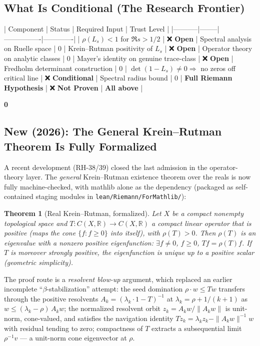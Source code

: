 \documentclass[11pt,a4paper]{article}
\newtheorem{theorem}{Theorem}[section]
\theoremstyle{definition}
\begin{document}
\subsection{What Is Conditional (The Research Frontier)}

| Component | Status | Required Input | Trust Level |
|-----------|--------|----------------|-------------|
| $\rho(L_s) < 1$ for $\Re s > 1/2$ | ❌ {\bf Open} | Spectral analysis on Ruelle space | 0%
| Krein–Rutman positivity of $L_s$ | ❌ {\bf Open} | Operator theory on analytic classes | 0%
| Mayer's identity on genuine trace-class | ❌ {\bf Open} | Fredholm determinant construction | 0%
| $\det(1 - L_s) \neq 0 \Rightarrow$ no zeros off critical line | ❌ {\bf Conditional} | Spectral radius bound | 0%
| {\bf Full Riemann Hypothesis} | ❌ {\bf Not Proven} | {\bf All above} | {\bf 0%

\subsection{New (2026): The General Krein--Rutman Theorem Is Fully Formalized}
\label{sec:kreinrutman}

A recent development (RH-38/39) closed the last admission in the
operator-theory layer. The \emph{general} Krein--Rutman existence theorem over
the reals is now fully machine-checked, with mathlib alone as the dependency
(packaged as self-contained staging modules in
\texttt{lean/Riemann/ForMathlib/}):

\begin{theorem}[Real Krein--Rutman, formalized]
Let $X$ be a compact nonempty topological space and
$T : C(X,\mathbb{R}) \to C(X,\mathbb{R})$ a compact linear operator that is
positive (maps the cone $\{f : f \geq 0\}$ into itself), with $\rho(T) > 0$.
Then $\rho(T)$ is an eigenvalue with a nonzero positive eigenfunction:
$\exists f \neq 0$, $f \geq 0$, $T f = \rho(T) f$. If $T$ is moreover strongly
positive, the eigenfunction is unique up to a positive scalar (geometric
simplicity).
\end{theorem}

The proof route is a \emph{resolvent blow-up} argument, which replaced an
earlier incomplete ``$\beta$-stabilization'' attempt: the seed domination
$\rho \cdot w \leq T w$ transfers through the positive resolvents
$A_k = (\lambda_k \cdot 1 - T)^{-1}$ at $\lambda_k = \rho + 1/(k+1)$ as
$w \leq (\lambda_k - \rho)\, A_k w$; the normalized resolvent orbit
$z_k = A_k w / \|A_k w\|$ is unit-norm, cone-valued, and satisfies the
navigation identity $T z_k = \lambda_k z_k - \|A_k w\|^{-1} w$ with residual
tending to zero; compactness of $T$ extracts a subsequential limit
$\rho^{-1} v$ --- a unit-norm cone eigenvector at $\rho$.

}
\end{document}
